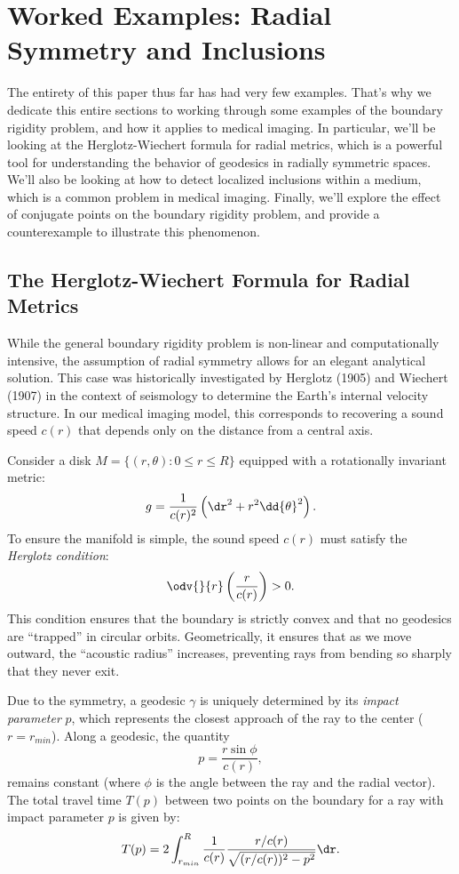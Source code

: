 \section{Worked Examples: Radial Symmetry and Inclusions}
\label{sec:worked_examples_radial_symmetry_and_inclusions}

The entirety of this paper thus far has had very few examples. That's why we dedicate this entire sections to working through some examples of the boundary rigidity problem, and how it applies to medical imaging. In particular, we'll be looking at the Herglotz-Wiechert formula for radial metrics, which is a powerful tool for understanding the behavior of geodesics in radially symmetric spaces. We'll also be looking at how to detect localized inclusions within a medium, which is a common problem in medical imaging. Finally, we'll explore the effect of conjugate points on the boundary rigidity problem, and provide a counterexample to illustrate this phenomenon.

\subsection{The Herglotz-Wiechert Formula for Radial Metrics}

While the general boundary rigidity problem is non-linear and computationally intensive, the assumption of radial symmetry allows for an elegant analytical solution. This case was historically investigated by Herglotz (1905) and Wiechert (1907) in the context of seismology to determine the Earth's internal velocity structure. In our medical imaging model, this corresponds to recovering a sound speed $c(r)$ that depends only on the distance from a central axis.

Consider a disk $M = \{ (r, \theta) : 0 \le r \le R \}$ equipped with a rotationally invariant metric:
\[%
  g = \frac{1}{c(r)^2} \left( \dr^2 + r^2 \dd{\theta}^2 \right)
.\]%
To ensure the manifold is simple, the sound speed $c(r)$ must satisfy the \emph{Herglotz condition}:
\[%
  \odv{}{r} \left( \frac{r}{c(r)} \right) > 0
.\]%
This condition ensures that the boundary is strictly convex and that no geodesics are ``trapped'' in circular orbits. Geometrically, it ensures that as we move outward, the ``acoustic radius'' increases, preventing rays from bending so sharply that they never exit.

Due to the symmetry, a geodesic $\gamma$ is uniquely determined by its \emph{impact parameter} $p$, which represents the closest approach of the ray to the center ($r=r_{min}$). Along a geodesic, the quantity
\[%
  p = \frac{r \sin \phi}{c(r)}
,\]%
remains constant (where $\phi$ is the angle between the ray and the radial vector). The total travel time $T(p)$ between two points on the boundary for a ray with impact parameter $p$ is given by:
\[%
  T(p) = 2 \int_{r_{min}}^R \frac{1}{c(r)} \frac{r/c(r)}{\sqrt{(r/c(r))^2 - p^2}} \dr
.\]%

